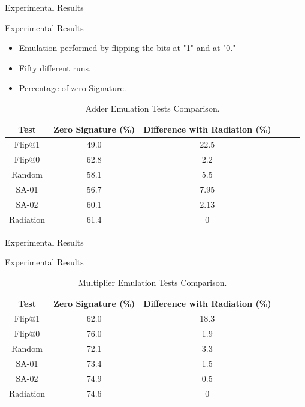 \documentclass[aspectratio=1610]{beamer}
\begin{document}
\begin{frame}{Experimental Results}

\begin{block}{Experimental Results}


\end{block}
\begin{itemize}
\item Emulation performed by flipping the bits at "1" and at "0."
\item Fifty different runs.
\item Percentage of zero Signature.

\end{itemize}
\begin{table}[tb!]
\center
\caption{Adder Emulation Tests Comparison.}
\label{AE}
\begin{tabular}{|c | c| c | c| c| c |} 
 \hline
Test & Zero Signature (\%) & Difference with Radiation (\%)   \\ 
\hline
 
 
 Flip@1& 49.0 &22.5   \\
 \hline
 Flip@0 & 62.8 & 2.2 \\ 
 \hline
 
 Random & 58.1 & 5.5  \\
 \hline
 SA-01 & 56.7 & 7.95\\
 \hline
 SA-02 & 60.1 & 2.13 \\
 \hline
 Radiation & 61.4 & 0  \\
 \hline
 
 
\end{tabular}
\end{table}



\end{frame}




\begin{frame}{Experimental Results}

\begin{block}{Experimental Results}
\end{block}
\begin{table}[tb!]
\center
\caption{Multiplier Emulation Tests Comparison.}
\label{ME}
\begin{tabular}{|c | c| c | c| c| c |} 
 \hline
Test & Zero Signature (\%) & Difference with Radiation (\%)   \\ 
\hline
 
 
 Flip@1& 62.0 &18.3   \\
 \hline
 Flip@0 & 76.0 & 1.9 \\ 
 \hline
 
 Random & 72.1 & 3.3  \\
 \hline
 SA-01 & 73.4 & 1.5 \\
 \hline
 SA-02 & 74.9 &  0.5\\
 \hline
 Radiation & 74.6 & 0  \\
 \hline
 
 
\end{tabular}
\end{table}



\end{frame}
\end{document}
